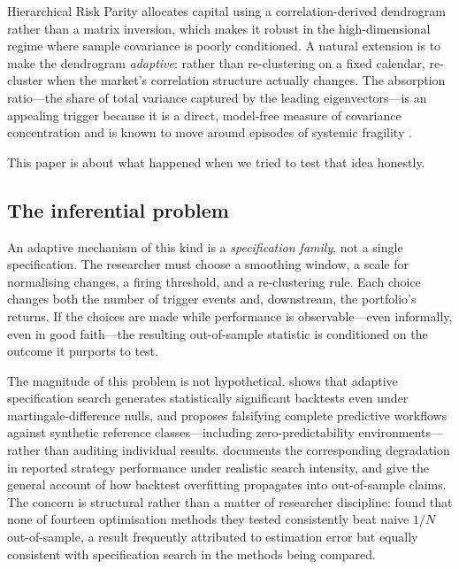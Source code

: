 \documentclass[12pt,letterpaper]{article}
\begin{document}
Hierarchical Risk Parity \citep{lopezdeprado2016} allocates capital using a
correlation-derived dendrogram rather than a matrix inversion, which makes it robust
in the high-dimensional regime where sample covariance is poorly conditioned. A
natural extension is to make the dendrogram \emph{adaptive}: rather than
re-clustering on a fixed calendar, re-cluster when the market's correlation
structure actually changes. The absorption ratio---the share of total variance
captured by the leading eigenvectors---is an appealing trigger because it is a
direct, model-free measure of covariance concentration and is known to move around
episodes of systemic fragility \citep{kritzman2011}.

This paper is about what happened when we tried to test that idea honestly.

\subsection{The inferential problem}

An adaptive mechanism of this kind is a \emph{specification family}, not a single
specification. The researcher must choose a smoothing window, a scale for
normalising changes, a firing threshold, and a re-clustering rule. Each choice
changes both the number of trigger events and, downstream, the portfolio's returns.
If the choices are made while performance is observable---even informally, even in
good faith---the resulting out-of-sample statistic is conditioned on the outcome it
purports to test.

The magnitude of this problem is not hypothetical. \citet{nikolopoulos2026} shows
that adaptive specification search generates statistically significant backtests
even under martingale-difference nulls, and proposes falsifying complete predictive
workflows against synthetic reference classes---including zero-predictability
environments---rather than auditing individual results. \citet{sheppert2026}
documents the corresponding degradation in reported strategy performance under
realistic search intensity, and \citet{bailey2014} give the general account of how
backtest overfitting propagates into out-of-sample claims. The concern is structural
rather than a matter of researcher discipline: \citet{demiguel2009} found that none
of fourteen optimisation methods they tested consistently beat naive $1/N$
out-of-sample, a result frequently attributed to estimation error but equally
consistent with specification search in the methods being compared.
\end{document}
